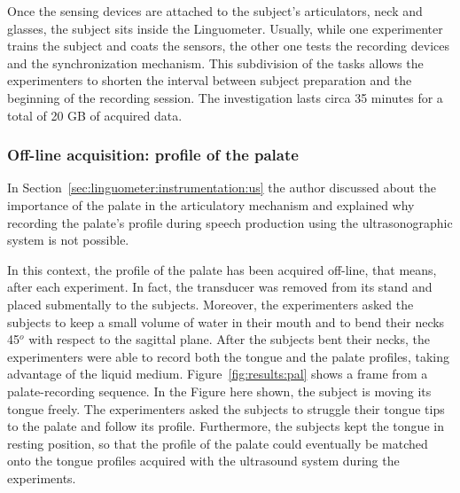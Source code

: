 Once the sensing devices are attached to the subject's articulators, neck and
glasses, the subject sits inside the Linguometer.
Usually, while one experimenter trains the subject and coats the sensors, the
other one tests the recording devices and the synchronization mechanism.
This subdivision of the tasks allows the experimenters to shorten the interval
between subject preparation and the beginning of the recording session.
The investigation lasts circa 35 minutes
for a total of 20 GB of acquired data.

\subsubsection{Off-line acquisition: profile of the palate}
\label{sec:experiments:palate}
In Section~\ref{sec:linguometer:instrumentation:us} 
%
%
the author discussed about the
importance of the palate in the articulatory mechanism and 
explained why recording the palate's profile during speech production using 
the ultrasonographic system is not possible.

In this context, the profile of the palate has been acquired off-line, that
means, after each experiment. 
In fact, the transducer was removed from its stand and placed submentally to the
subjects. 
Moreover, the experimenters asked the subjects to keep a small volume of water
in their mouth and to bend their necks 45$^o$ with respect to the sagittal
plane.
After the subjects bent their necks, the experimenters were able to record both
the tongue and the palate profiles, taking advantage of the liquid medium.
Figure~\ref{fig:results:pal} shows a frame from a palate-recording sequence.
In the Figure here shown, the subject is moving its tongue freely. 
The experimenters asked the subjects to struggle their tongue tips to the
palate and follow its profile.
Furthermore, the subjects kept the tongue in resting position, so that the
profile of the palate could eventually be matched onto the tongue profiles
acquired with the ultrasound system during the experiments.


